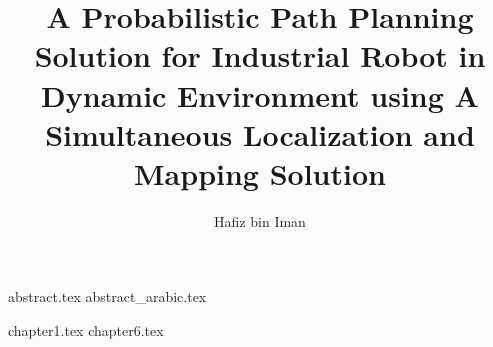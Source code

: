 


\author{Hafiz bin Iman}
\title{A Probabilistic Path Planning Solution for Industrial Robot in Dynamic Environment using A Simultaneous Localization and Mapping Solution}

\renewcommand{\setflag}{\newif \ifwhole \wholetrue}
\frontmatter
{abstract.tex}
{abstract_arabic.tex}
\maketitle
\tableofcontents
\listofalgorithmes
\listoffigures
\listoftables

\doublespacing
\mainmatter
{chapter1.tex}
{chapter6.tex}

\printbibliography


